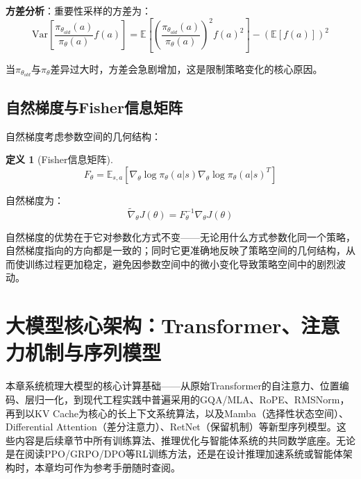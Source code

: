 \documentclass[12pt,a4paper]{article}
\newtheorem{definition}[theorem]{定义}
\begin{document}
\textbf{方差分析}：重要性采样的方差为：
\begin{equation}
\text{Var}\left[\frac{\pi_{\theta_{old}}(a)}{\pi_\theta(a)} f(a)\right] = \mathbb{E}\left[\left(\frac{\pi_{\theta_{old}}(a)}{\pi_\theta(a)}\right)^2 f(a)^2\right] - \left(\mathbb{E}[f(a)]\right)^2
\end{equation}

当$\pi_{\theta_{old}}$与$\pi_\theta$差异过大时，方差会急剧增加，这是限制策略变化的核心原因。

\subsection{自然梯度与Fisher信息矩阵}

自然梯度考虑参数空间的几何结构：

\begin{definition}[Fisher信息矩阵]
\begin{equation}
F_\theta = \mathbb{E}_{s,a}\left[\nabla_\theta \log \pi_\theta(a|s) \nabla_\theta \log \pi_\theta(a|s)^T\right]
\end{equation}
\end{definition}

自然梯度为：
\begin{equation}
\tilde{\nabla}_\theta J(\theta) = F_\theta^{-1} \nabla_\theta J(\theta)
\end{equation}

自然梯度的优势在于它对参数化方式不变——无论用什么方式参数化同一个策略，自然梯度指向的方向都是一致的；同时它更准确地反映了策略空间的几何结构，从而使训练过程更加稳定，避免因参数空间中的微小变化导致策略空间中的剧烈波动。


\section{大模型核心架构：Transformer、注意力机制与序列模型}
\label{sec:arch}

本章系统梳理大模型的核心计算基础——从原始Transformer的自注意力、位置编码、层归一化，到现代工程实践中普遍采用的GQA/MLA、RoPE、RMSNorm，再到以KV Cache为核心的长上下文系统算法，以及Mamba（选择性状态空间）、Differential Attention（差分注意力）、RetNet（保留机制）等新型序列模型。这些内容是后续章节中所有训练算法、推理优化与智能体系统的共同数学底座。无论是在阅读PPO/GRPO/DPO等RL训练方法，还是在设计推理加速系统或智能体架构时，本章均可作为参考手册随时查阅。
\end{document}
